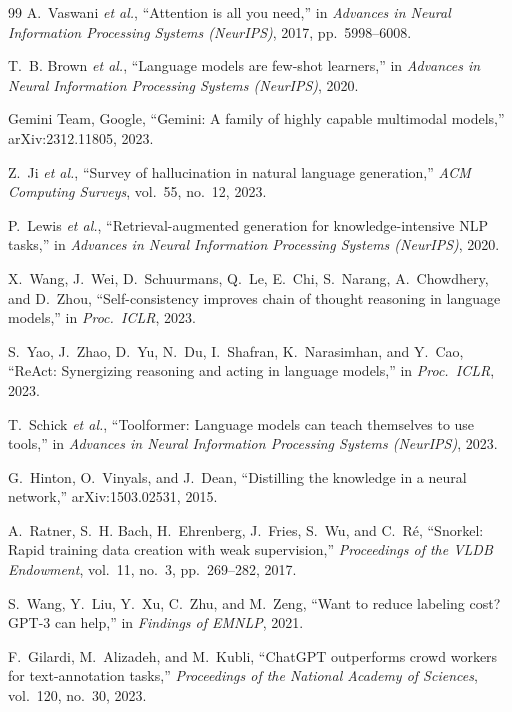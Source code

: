\begin{thebibliography}{99}
 A.~Vaswani \emph{et al.}, ``Attention is all you need,'' in \emph{Advances in Neural Information
Processing Systems (NeurIPS)}, 2017, pp.~5998--6008.

 T.~B. Brown \emph{et al.}, ``Language models are few-shot learners,'' in \emph{Advances in Neural
Information Processing Systems (NeurIPS)}, 2020.

 Gemini Team, Google, ``Gemini: A family of highly capable multimodal models,''
arXiv:2312.11805, 2023.

 Z.~Ji \emph{et al.}, ``Survey of hallucination in natural language generation,'' \emph{ACM Computing
Surveys}, vol.~55, no.~12, 2023.

 P.~Lewis \emph{et al.}, ``Retrieval-augmented generation for knowledge-intensive NLP tasks,'' in
\emph{Advances in Neural Information Processing Systems (NeurIPS)}, 2020.

 X.~Wang, J.~Wei, D.~Schuurmans, Q.~Le, E.~Chi, S.~Narang, A.~Chowdhery, and D.~Zhou,
``Self-consistency improves chain of thought reasoning in language models,'' in \emph{Proc.\ ICLR}, 2023.

 S.~Yao, J.~Zhao, D.~Yu, N.~Du, I.~Shafran, K.~Narasimhan, and Y.~Cao, ``ReAct: Synergizing reasoning
and acting in language models,'' in \emph{Proc.\ ICLR}, 2023.

 T.~Schick \emph{et al.}, ``Toolformer: Language models can teach themselves to use tools,'' in
\emph{Advances in Neural Information Processing Systems (NeurIPS)}, 2023.

 G.~Hinton, O.~Vinyals, and J.~Dean, ``Distilling the knowledge in a neural network,''
arXiv:1503.02531, 2015.

 A.~Ratner, S.~H. Bach, H.~Ehrenberg, J.~Fries, S.~Wu, and C.~R\'e, ``Snorkel: Rapid training data
creation with weak supervision,'' \emph{Proceedings of the VLDB Endowment}, vol.~11, no.~3, pp.~269--282, 2017.

 S.~Wang, Y.~Liu, Y.~Xu, C.~Zhu, and M.~Zeng, ``Want to reduce labeling cost? GPT-3 can
help,'' in \emph{Findings of EMNLP}, 2021.

 F.~Gilardi, M.~Alizadeh, and M.~Kubli, ``ChatGPT outperforms crowd workers for text-annotation
tasks,'' \emph{Proceedings of the National Academy of Sciences}, vol.~120, no.~30, 2023.


\end{thebibliography}
